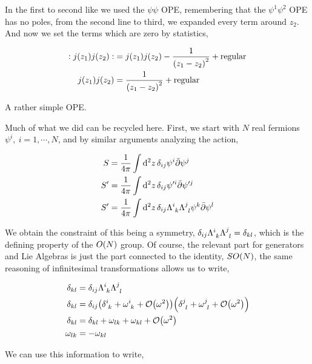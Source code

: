 In the first to second like we used the $\psi\psi$ OPE, remembering that the $\psi^1\psi^2$ OPE has no poles, from the second line to third, we expanded 
every term around $z_2$. And now we set the terms which are zero by statistics,

\begin{align*}
    :j\qty(z_1)j\qty(z_2):&=j\qty(z_1)j\qty(z_2)-\frac{1}{\qty(z_1-z_2)^2}+\textnormal{regular}\\
    j\qty(z_1)j\qty(z_2)&=\frac{1}{\qty(z_1-z_2)^2}+\textnormal{regular}
\end{align*}

A rather simple OPE.

\probitem{}

Much of what we did can be recycled here. First, we start with $N$ real fermions $\psi^i,\ i=1,\cdots, N$, and by similar arguments analyzing the action,

\begin{align*}
    S&=\frac{1}{4\pi}\int\dd[2]{z}\delta_{ij}\psi^i\bar\partial\psi^j\\
    S'&=\frac{1}{4\pi}\int\dd[2]{z}\delta_{ij}\psi'^i\bar\partial\psi'^j\\
    S'&=\frac{1}{4\pi}\int\dd[2]{z}\delta_{ij}\tensor{\Lambda}{^i_k}\tensor{\Lambda}{^j_l}\psi^k\bar\partial\psi^l
\end{align*}

We obtain the constraint of this being a symmetry, $\delta_{ij}\tensor{\Lambda}{^i_k}\tensor{\Lambda}{^j_l}=\delta_{kl}$, which is the defining 
property of the $O\qty(N)$ group. Of course, the relevant part for generators and Lie Algebras is just the part connected to the identity, $SO\qty(N)$, 
the same reasoning of infinitesimal transformations allows us to write,

\begin{align*}
    \delta_{kl}&=\delta_{ij}\tensor{\Lambda}{^i_k}\tensor{\Lambda}{^j_l}\\
    \delta_{kl}&=\delta_{ij}\qty(\tensor{\delta}{^i_k}+\tensor{\omega}{^i_k}+\mathcal O\qty(\omega^2))\qty(\tensor{\delta}{^j_l}+\tensor{\omega}{^j_l}+\mathcal O\qty(\omega^2))\\
    \delta_{kl}&=\delta_{kl}+\omega_{lk}+\omega_{kl}+\mathcal O\qty(\omega^2)\\
    \omega_{lk}&=-\omega_{kl}
\end{align*}

We can use this information to write,

